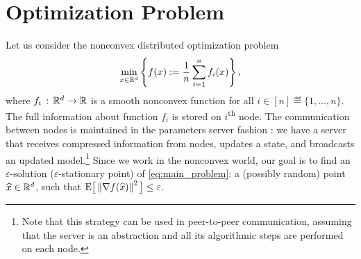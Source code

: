 \documentclass{article}
\begin{document}
\section{Optimization Problem}
Let us consider the nonconvex distributed optimization problem
\begin{align}
    \label{eq:main_problem} 
    \min \limits_{x \in \mathbb{R}^d}\left\{f(x) := \frac{1}{n}\sum \limits_{i=1}^n f_i(x)\right\},
\end{align}
where $f_i\,:\,\mathbb{R}^d \rightarrow \mathbb{R}$ is a smooth nonconvex function for all $i \in [n] \eqdef \{1, \dots, n\}.$ The full information about function $f_i$ is stored on $i$\textsuperscript{th} node. The communication between nodes is maintained in the parameters server fashion \citep{kairouz2021advances}: we have a server that receives compressed information from nodes, updates a state, and broadcasts an updated model.\footnote{Note that this strategy can be used in peer-to-peer communication, assuming that the server is an abstraction and all its algorithmic steps are performed on each node.} Since we work in the nonconvex world, our goal is to find an $\varepsilon$-solution ($\varepsilon$-stationary point) of \eqref{eq:main_problem}: a (possibly random) point $\widehat{x}\in \mathbb{R}^d$, such that ${\rm E}\big[\left\| \nabla f(\widehat{x}) \right\|^2\big] \leq \varepsilon.$
\end{document}
